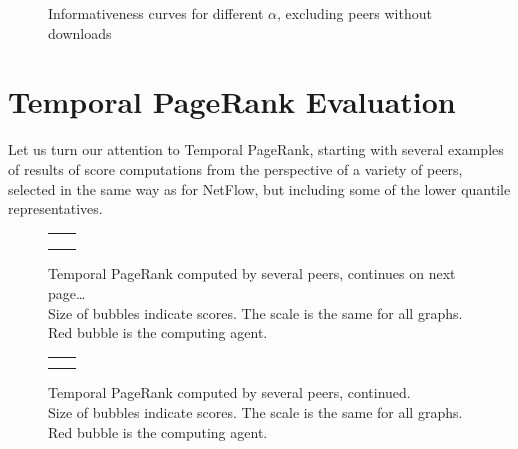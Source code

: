 \documentclass[a4paper,11pt]{book}
\theoremstyle{definition}
\begin{document}
\begin{figure}[ht]
    \centering
    
    \caption{Informativeness curves for different $\alpha$, excluding peers without downloads}
    \label{fig:info_filter}
\end{figure}

\section{Temporal PageRank Evaluation}

Let us turn our attention to Temporal PageRank, starting with several examples of results of
score computations from the perspective of a variety of peers, selected in the same way as for
NetFlow, but including some of the lower quantile representatives.

\begin{figure}[ht]
    \centering
    \begin{tabular}[ht]{cc}
         &
         \\
         &
         \\

         &
         \\
    \end{tabular}
    \caption{Temporal PageRank computed by several peers, continues on next page\ldots \\
        Size of bubbles indicate scores. The scale is the same for all graphs. Red bubble is the computing agent.}
    \label{fig:tpr_per_peer_1}
\end{figure}

\begin{figure}[ht]
    \ContinuedFloat
    \centering
    \begin{tabular}[ht]{cc}
         & 

         \\ 
         &
         \\

    \end{tabular}
    \caption{Temporal PageRank computed by several peers, continued. \\
        Size of bubbles indicate scores. The scale is the same for all graphs. Red bubble is the computing agent.}
    \label{fig:tpr_per_peer_2}
\end{figure}
\end{document}
